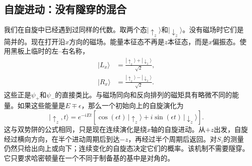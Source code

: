 \begin{classroomqa}
\end{classroomqa}

\subsection{自旋进动：没有隧穿的混合}

我们在自旋中已经遇到过同样的代数。取两个态\(|\uparrow_z\rangle\)和\(|\downarrow_z\rangle\)。没有磁场时它们是简并的。现在打开沿\(x\)方向的磁场。能量本征态不再是\(z\)本征态，而是\(x\)偏振态。使用黑板上临时的左--右名称，
\begin{align}
|L_x\rangle &= \frac{|\uparrow_z\rangle+|\downarrow_z\rangle}{\sqrt{2}},\\
|R_x\rangle &= \frac{|\uparrow_z\rangle-|\downarrow_z\rangle}{\sqrt{2}}.
\end{align}
这些正是\(\psi_+\)和\(\psi_-\)的直接类比。与磁场同向和反向排列的磁矩具有略微不同的能量。如果这些能量是\(E\mp\epsilon\)，那么一个初始向上的自旋演化为
\begin{equation}
|\uparrow_z,t\rangle
= e^{-iEt}\left[\cos(\epsilon t)\,|\uparrow_z\rangle
+ i\sin(\epsilon t)\,|\downarrow_z\rangle\right].
\end{equation}
这与双势阱的公式相同，只是现在连续演化是绕\(x\)轴的自旋进动。从\(+z\)出发，自旋经过横向方向，在半个进动周期后到达\(-z\)，再经过半个周期后返回。对\(S_z\)的测量仍然只给出向上或向下；连续变化的自旋态决定它们的概率。该机制不需要隧穿。它只要求哈密顿量在一个不同于制备基的基中是对角的。

\begin{classroomqa}
\end{classroomqa}

\begin{classroomqa}
\end{classroomqa}

